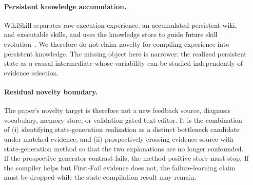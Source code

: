 \paragraph{Persistent knowledge accumulation.}
WikiSkill separates raw execution experience, an accumulated persistent wiki, and executable skills, and uses the knowledge store to guide future skill evolution~\citep{tang2026wikiskill}. We therefore do not claim novelty for compiling experience into persistent knowledge. The missing object here is narrower: the realized persistent state as a causal intermediate whose variability can be studied independently of evidence selection.

\paragraph{Residual novelty boundary.}
The paper's novelty target is therefore not a new feedback source, diagnosis vocabulary, memory store, or validation-gated text editor. It is the combination of (i) identifying state-generation realization as a distinct bottleneck candidate under matched evidence, and (ii) prospectively crossing evidence source with state-generation method so that the two explanations are no longer confounded. If the prospective generator contrast fails, the method-positive story must stop. If the compiler helps but First-Fail evidence does not, the failure-learning claim must be dropped while the state-compilation result may remain.
